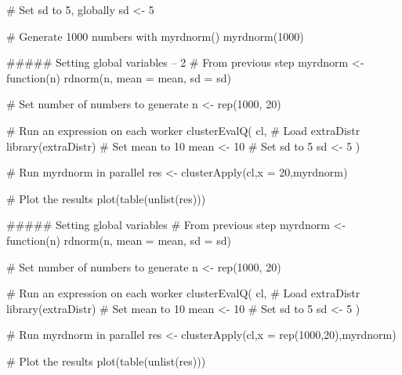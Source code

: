 # Set sd to 5, globally
sd <- 5

# Generate 1000 numbers with myrdnorm()
myrdnorm(1000)



##### Setting global variables -- 2
# From previous step
myrdnorm <- function(n) {
  rdnorm(n, mean = mean, sd = sd)
}

# Set number of numbers to generate
n <- rep(1000, 20)

# Run an expression on each worker
clusterEvalQ(
  cl, {
    # Load extraDistr
    library(extraDistr)
    # Set mean to 10
    mean <- 10
    # Set sd to 5
    sd <- 5
})

# Run myrdnorm in parallel
res <- clusterApply(cl,x = 20,myrdnorm)

# Plot the results
plot(table(unlist(res)))



##### Setting global variables
# From previous step
myrdnorm <- function(n) {
  rdnorm(n, mean = mean, sd = sd)
}

# Set number of numbers to generate
n <- rep(1000, 20)

# Run an expression on each worker
clusterEvalQ(
  cl, {
    # Load extraDistr
    library(extraDistr)
    # Set mean to 10
    mean <- 10
    # Set sd to 5
    sd <- 5
})

# Run myrdnorm in parallel
res <- clusterApply(cl,x = rep(1000,20),myrdnorm)

# Plot the results
plot(table(unlist(res)))

